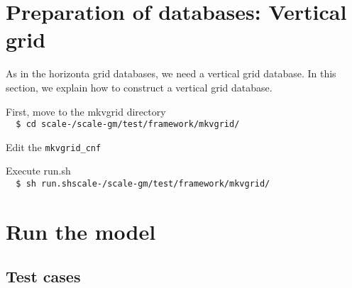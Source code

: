 \section{Preparation of databases: Vertical grid}
As in the horizonta grid databases, we need a vertical grid database.
In this section, we explain how to construct a vertical grid database.

First, move to the mkvgrid directory \\
\verb|  $ cd scale-|{\version}\verb|/scale-gm/test/framework/mkvgrid/|

Edit the \verb|mkvgrid_cnf|

Execute run.sh  \\
\verb|  $ sh run.shscale-|{\version}\verb|/scale-gm/test/framework/mkvgrid/|



\section{Run the model}
\subsection{Test cases}

